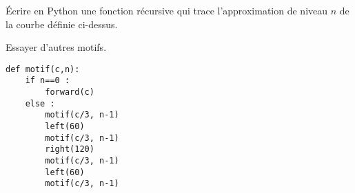 \begin{Exercise}[title = {Tracé}]\it 

Écrire en Python une fonction récursive  qui trace l'approximation de niveau $n$ de la courbe définie ci-dessus.

Essayer d'autres motifs.
\end{Exercise}
\begin{Answer}

\begin{lstlisting}
def motif(c,n):
    if n==0 :
        forward(c)
    else :
        motif(c/3, n-1)
        left(60)
        motif(c/3, n-1)
        right(120)
        motif(c/3, n-1)
        left(60)
        motif(c/3, n-1)

\end{lstlisting}

\newpage
\end{Answer}





